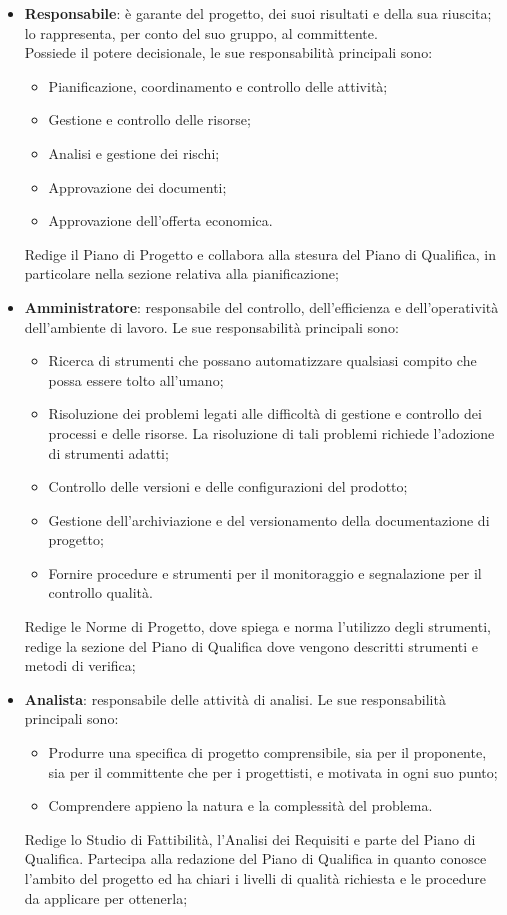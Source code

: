 		\begin{itemize}
			
			\item \textbf{Responsabile}: è garante del progetto, dei suoi risultati e della sua riuscita; lo rappresenta, per conto del suo gruppo, al committente.\\
			Possiede il potere decisionale, le sue responsabilità principali sono:
			\begin{itemize}
				\item Pianificazione, coordinamento e controllo delle attività;
				\item Gestione e controllo delle risorse;
				\item Analisi e gestione dei rischi;
				\item Approvazione dei documenti;
				\item Approvazione dell’offerta economica.
			\end{itemize}
			Redige il Piano di Progetto e collabora alla stesura del Piano di Qualifica, in particolare nella sezione relativa alla pianificazione;
			
			\item \textbf{Amministratore}: responsabile del controllo, dell’efficienza e dell’operatività dell’ambiente di lavoro.
			Le sue responsabilità principali sono:
			\begin{itemize}
				\item Ricerca di strumenti che possano automatizzare qualsiasi compito che possa essere tolto all’umano;
				\item Risoluzione dei problemi legati alle difficoltà di gestione e controllo dei processi e delle risorse. La risoluzione di tali problemi richiede l’adozione di strumenti adatti;
				\item Controllo delle versioni e delle configurazioni del prodotto;
				\item Gestione dell’archiviazione e del versionamento della documentazione di progetto;
				\item Fornire procedure e strumenti per il monitoraggio e segnalazione per il controllo qualità.
			\end{itemize}
			Redige le Norme di Progetto, dove spiega e norma l’utilizzo degli strumenti, redige la sezione del Piano di Qualifica dove vengono descritti strumenti e metodi di verifica;
		
			\item \textbf{Analista}: responsabile delle attività di analisi.
			Le sue responsabilità principali sono:			
			\begin{itemize}
				\item Produrre una specifica di progetto comprensibile, sia per il proponente, sia per il committente che per i progettisti, e motivata in ogni suo punto;
				\item Comprendere appieno la natura e la complessità del problema.
			\end{itemize}
			Redige lo Studio di Fattibilità, l’Analisi dei Requisiti e parte del Piano di Qualifica. 
			Partecipa alla redazione del Piano di Qualifica in quanto conosce l’ambito del progetto ed ha chiari i livelli di qualità richiesta e le procedure da applicare per ottenerla;
		

\end{itemize}
